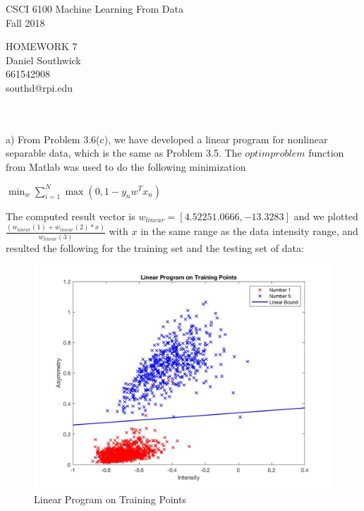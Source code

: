 \documentclass[12pt]{article}
\begin{document}
\begin{center}
CSCI 6100 Machine Learning From Data\\
Fall 2018\\
\end{center}
\begin{center}
HOMEWORK 7\\
Daniel Southwick\\
661542908\\
southd@rpi.edu
\end{center}
\vspace{.1in}

 \\\\
\indent a) From Problem 3.6(c), we have developed a linear program for nonlinear separable data, which is the same as Problem 3.5. The $optimproblem$ function from Matlab was used to do the following minimization
\begin{center}
$\displaystyle \min_w \sum_{i = 1}^{N}\max (0,1-y_nw^Tx_n)$
\end{center}
The computed result vector is $w_{linear} = \left[ 4.5225 1.0666, -13.3283 \right]$ and we plotted\\$\displaystyle \frac{(w_{linear}(1)+w_{linear}(2)*x)}{w_{linear}(3)}$ with $x$ in the same range as the data intensity range, and resulted the following for the training set and the testing set of data: 
\begin{figure}[H]
  \centering
  \includegraphics[scale = 0.3]{Pic1.jpg}
  \caption{Linear Program on Training Points}
  \label{fig:Pic1}
\end{figure}
\end{document}
